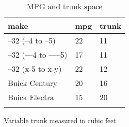 \documentclass{article}
\begin{document}
\begin{table}[tbp] \centering
{}

\caption{MPG and trunk space}
\begin{tabularx}{\linewidth}{@{}lCC@{}}

\toprule
{make}&{mpg}&{trunk} \tabularnewline
\midrule \addlinespace[\belowrulesep]
--32 (--4 to --5)&22&11 \tabularnewline
--32 (---4 to -----5)&17&11 \tabularnewline
--32 (x-5 to x-y)&22&12 \tabularnewline
Buick Century&20&16 \tabularnewline
Buick Electra&15&20 \tabularnewline
\bottomrule \addlinespace[\belowrulesep]

\end{tabularx}
\parbox{\linewidth}{\footnotesize Variable trunk measured in cubic feet}
\end{table}
\end{document}
